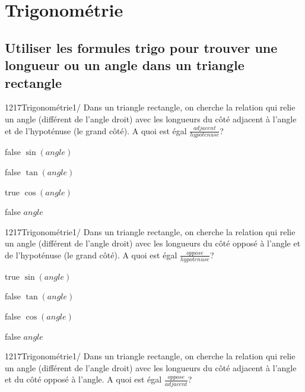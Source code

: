 \documentclass[11pt]{article}
\begin{document}
\tableofcontents

\section{Trigonométrie}
	
		\subsection{Utiliser les formules trigo pour trouver une longueur ou un angle dans un triangle rectangle}
        
        	\begin{question}{1217}{Trigonométrie}{1}{/}
				Dans un triangle rectangle, on cherche la relation qui relie un angle (différent de l'angle droit) avec les longueurs du côté adjacent à l'angle et de l'hypoténuse (le grand côté). A quoi est égal $\frac{adjacent}{hypotenuse}$?
            \end{question}

            \begin{reponses}
            	\item[false] $\sin(angle)$
            	\item[false] $\tan(angle)$
                \item[true] $\cos(angle)$
                \item[false] $angle$
            \end{reponses}
        
        	\begin{question}{1217}{Trigonométrie}{1}{/}
				Dans un triangle rectangle, on cherche la relation qui relie un angle (différent de l'angle droit) avec les longueurs du côté opposé à l'angle et de l'hypoténuse (le grand côté). A quoi est égal $\frac{oppose}{hypotenuse}$?
            \end{question}

            \begin{reponses}
            	\item[true] $\sin(angle)$
            	\item[false] $\tan(angle)$
                \item[false] $\cos(angle)$
                \item[false] $angle$
            \end{reponses}
        
        	\begin{question}{1217}{Trigonométrie}{1}{/}
				Dans un triangle rectangle, on cherche la relation qui relie un angle (différent de l'angle droit) avec les longueurs du côté adjacent à l'angle et du côté opposé à l'angle. A quoi est égal $\frac{oppose}{adjacent}$?
            \end{question}
\end{document}
